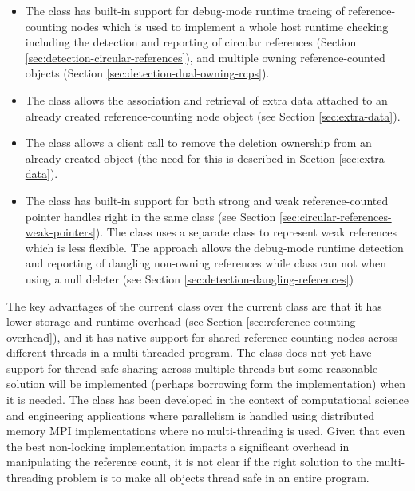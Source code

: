 \documentclass[pdf,ps2pdf,11pt]{SANDreport}
\begin{document}
\begin{itemize}

{}\item The {} class has built-in support for debug-mode
runtime tracing of reference-counting nodes which is used to implement
a whole host runtime checking including the detection and reporting of
circular references (Section
{}\ref{sec:detection-circular-references}), and multiple owning
reference-counted objects (Section
{}\ref{sec:detection-dual-owning-rcps}).

{}\item The {} class allows the association and retrieval of
extra data attached to an already created reference-counting node
object (see Section {}\ref{sec:extra-data}).

{}\item The {} class allows a client call {}
to remove the deletion ownership from an already created {}
object (the need for this is described in Section
{}\ref{sec:extra-data}).

{}\item The {} class has built-in support for both strong and
weak reference-counted pointer handles right in the same class (see
Section {}\ref{sec:circular-references-weak-pointers}).  The
{} class uses a separate
{} class to represent weak references which is
less flexible.  The {} approach allows the debug-mode runtime
detection and reporting of dangling non-owning references while
{} class can not when using a null deleter
(see Section {}\ref{sec:detection-dangling-references})

\end{itemize}

The key advantages of the current {} class
over the current {} class are that it has lower storage and
runtime overhead (see Section
{}\ref{sec:reference-counting-overhead}), and it has native support
for shared reference-counting nodes across different threads in a
multi-threaded program.  The {} class does not yet have
support for thread-safe sharing across multiple threads but some
reasonable solution will be implemented (perhaps borrowing form the
{} implementation) when it is needed.  The
{} class has been developed in the context of computational
science and engineering applications where parallelism is handled
using distributed memory MPI implementations where no
multi-threading is used.  Given that even the best non-locking
{} implementation imparts a significant
overhead in manipulating the reference count, it is not clear if the
right solution to the multi-threading problem is to make all
{} objects thread safe in an entire program.
\end{document}
